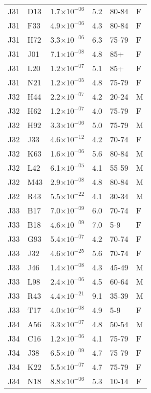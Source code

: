 \begin{longtable}{lllrll}
   J31 & D13 & 1.7$\times10^{-06}$ & 5.2 & 80-84 & F \\ 
   J31 & F33 & 4.9$\times10^{-06}$ & 4.3 & 80-84 & F \\ 
   J31 & H72 & 3.3$\times10^{-06}$ & 6.3 & 75-79 & F \\ 
   J31 & J01 & 7.1$\times10^{-08}$ & 4.8 & 85+ & F \\ 
   J31 & L20 & 1.2$\times10^{-07}$ & 5.1 & 85+ & F \\ 
   J31 & N21 & 1.2$\times10^{-05}$ & 4.8 & 75-79 & F \\ 
   J32 & H44 & 2.2$\times10^{-07}$ & 4.2 & 20-24 & M \\ 
   J32 & H62 & 1.2$\times10^{-07}$ & 4.0 & 75-79 & F \\ 
   J32 & H92 & 3.3$\times10^{-06}$ & 5.0 & 75-79 & M \\ 
   J32 & J33 & 4.6$\times10^{-12}$ & 4.2 & 70-74 & F \\ 
   J32 & K63 & 1.6$\times10^{-06}$ & 5.6 & 80-84 & M \\ 
   J32 & L42 & 6.1$\times10^{-05}$ & 4.1 & 55-59 & M \\ 
   J32 & M43 & 2.9$\times10^{-08}$ & 4.8 & 80-84 & M \\ 
   J32 & R43 & 5.5$\times10^{-22}$ & 4.1 & 30-34 & M \\ 
   J33 & B17 & 7.0$\times10^{-09}$ & 6.0 & 70-74 & F \\ 
   J33 & B18 & 4.6$\times10^{-09}$ & 7.0 & 5-9 & F \\ 
   J33 & G93 & 5.4$\times10^{-07}$ & 4.2 & 70-74 & F \\ 
   J33 & J32 & 4.6$\times10^{-25}$ & 5.6 & 70-74 & F \\ 
   J33 & J46 & 1.4$\times10^{-08}$ & 4.3 & 45-49 & M \\ 
   J33 & L98 & 2.4$\times10^{-06}$ & 4.5 & 60-64 & M \\ 
   J33 & R43 & 4.4$\times10^{-21}$ & 9.1 & 35-39 & M \\ 
   J33 & T17 & 4.0$\times10^{-08}$ & 4.9 & 5-9 & F \\ 
   J34 & A56 & 3.3$\times10^{-07}$ & 4.8 & 50-54 & M \\ 
   J34 & C16 & 1.2$\times10^{-06}$ & 4.1 & 75-79 & F \\ 
   J34 & J38 & 6.5$\times10^{-09}$ & 4.7 & 75-79 & F \\ 
   J34 & K22 & 5.5$\times10^{-07}$ & 4.7 & 75-79 & F \\ 
   J34 & N18 & 8.8$\times10^{-06}$ & 5.3 & 10-14 & F \\ 

\end{longtable}
